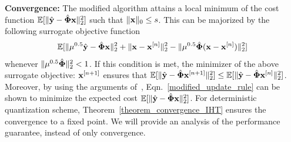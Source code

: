 \documentclass{article}
\begin{document}




{\bf Convergence:} The modified algorithm attains a local minimum of the cost function $\mathbb{E} [ \| \hat{\bf y} - \hat{\bf \Phi}{\bf x}\|_2^2]$ such that $\|{\bf x}\|_0 \leq s$. This can be majorized by the following surrogate objective function 
\begin{equation*}
    \begin{split}
        \mathbb{E} [\|\mu^{0.5}\hat{\bf y} -   \hat{\bf \Phi}{\bf x}\|_2^2+ \|{\bf x} 
    - {\bf x}^{[n]} \|_2^2
    - \|\mu^{0.5}\hat{\bf \Phi}({\bf x}- {\bf x}^{[n]}) \|_2^2] 
    \end{split}
\end{equation*}
whenever $\| \mu^{0.5}\hat{\bf \Phi}\|_2^2 <1$. If this condition is met, the minimizer of the above surrogate objective: ${\bf x}^{[n+1]}$ ensures that $\mathbb{E} [\| \hat{\bf y} - \hat{\bf \Phi}{\bf x}^{[n+1]}\|_2^2] \leq \mathbb{E}[ \| \hat{\bf y} - \hat{\bf \Phi}{\bf x}^{[n]}\|_2^2]$. Moreover, by using the arguments of~\cite{blumensath2008iht}, Eqn.~\ref{modified_update_rule} can be shown to minimize the expected cost $\mathbb{E} [ \| \hat{\bf y} - \hat{\bf \Phi}{\bf x}\|_2^2]$. For deterministic quantization scheme, Theorem~\ref{theorem_convergence_IHT} ensures the convergence to a fixed point. {We
will provide an analysis of the performance guarantee,
instead of only convergence.}
\end{document}
